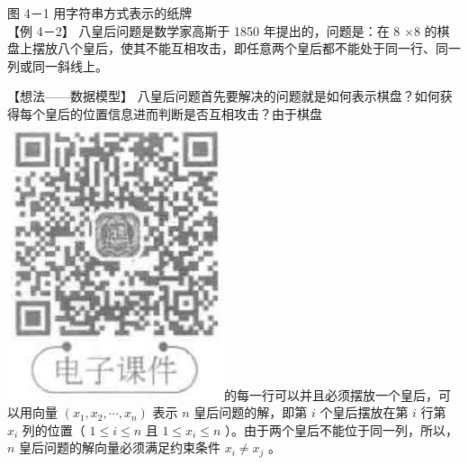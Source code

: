 \documentclass[10pt]{article}
\begin{document}
图 4－1 用字符串方式表示的纸牌\\
【例 4－2】 八皇后问题是数学家高斯于 1850 年提出的，问题是：在 8 $\times 8$ 的棋盘上摆放八个皇后，使其不能互相攻击，即任意两个皇后都不能处于同一行、同一列或同一斜线上。

【想法——数据模型】 八皇后问题首先要解决的问题就是如何表示棋盘？如何获得每个皇后的位置信息进而判断是否互相攻击？由于棋盘\\
\includegraphics[max width=\textwidth]{2025_06_06_704745ea57b15b2333e5g-113(3)}的每一行可以并且必须摆放一个皇后，可以用向量 $\left(x_{1}, x_{2}, \cdots, x_{n}\right)$ 表示 $n$ 皇后问题的解，即第 $i$ 个皇后摆放在第 $i$ 行第 $x_{i}$ 列的位置（ $1 \leqslant i \leqslant n$ 且 $1 \leqslant x_{i} \leqslant n$ ）。由于两个皇后不能位于同一列，所以，$n$ 皇后问题的解向量必须满足约束条件 $x_{i} \neq x_{j}$ 。
\end{document}
